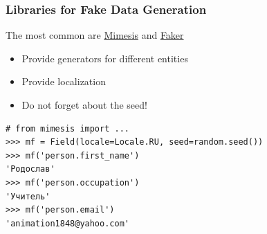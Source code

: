 \documentclass[compress]{beamer}
\begin{document}
\begin{frame}[fragile]
\frametitle{Libraries for Fake Data Generation}

The most common are \href{https://mimesis.name/en/master/}{Mimesis\footnotemark[1]} and \href{https://faker.readthedocs.io/en/master/}{Faker\footnotemark[2]}


\begin{center}
    \begin{itemize}
        \item Provide generators for different entities
        \item Provide localization
        \item Do not forget about the seed!\footnotemark[3]
    \end{itemize}
\end{center}


\vspace{0.2in}

\begin{verbatim}
# from mimesis import ...
>>> mf = Field(locale=Locale.RU, seed=random.seed())
>>> mf('person.first_name')
'Родослав'
>>> mf('person.occupation')
'Учитель'
>>> mf('person.email')
'animation1848@yahoo.com'
\end{verbatim}

\end{frame}



\end{document}
